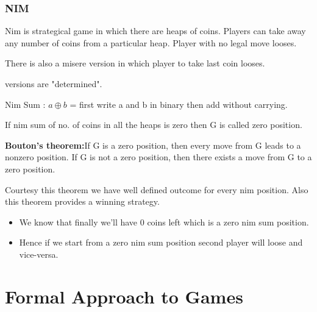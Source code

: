 \documentclass[12pt]{beamer}
\begin{document}
\begin{frame}

\frametitle{NIM}
\begin{definition}
Nim is strategical game in which there are heaps of coins. Players can take away any number of coins from a particular heap. Player with no legal move looses.
\end{definition}

\pause
There is also a misere version in which player to take last coin looses.
\pause

\begin{block}
versions are "determined".
\end{block}

\pause
\begin{definition}
Nim Sum : $a \oplus b$ = first write a and b in binary then add without carrying.
\end{definition}

\pause
If nim sum of no. of coins in all the heaps is zero then G is called zero position.

\end{frame}

\begin{frame}

\begin{theorem}
\textbf{Bouton's theorem:}If G is a zero position, then every move from G leads to a nonzero
position. If G is not a zero position, then there exists a move from G to a zero
position.
\end{theorem}

\pause

Courtesy this theorem we have well defined outcome for every nim position. Also this theorem provides a winning strategy.
\pause

\begin{itemize}
\item We know that finally we'll have 0 coins left which is a zero nim sum position.
\item Hence if we start from a zero nim sum position second player will loose and vice-versa.
\end{itemize}

\end{frame}

\section{Formal Approach to Games}
\end{document}

